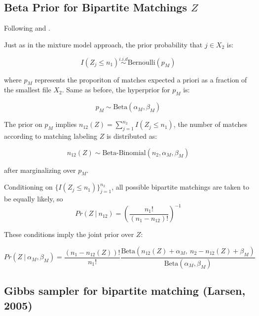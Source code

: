\documentclass[11pt,reqno]{amsart}
\begin{document}
\subsection{Beta Prior for Bipartite Matchings $Z$}

Following \cite{larsen_2005} and \cite{sadinle_2017}.

Just as in the mixture model approach, the prior probability that $j \in X_2$ is:

$$ I(Z_j \leq n_1)  \overset{i.i.d}{\sim} \text{Bernoulli}(p_M)$$

where $p_M$ represents the proporiton of matches expected a priori as a fraction of the smallest file $X_2$.  Same as before, the hyperprior for $p_M$ is:

$$ p_M \sim \text{Beta}(\alpha_{M}, \beta_{M})$$ 

The prior on $p_M$ implies $n_{12}(Z) = \sum_{j=1}^{n_2} I(Z_j \leq n_1)$, the number of matches according to matching labeling $Z$ is distributed as:

$$n_{12}(Z) \sim \text{Beta-Binomial}(n_2, \alpha_{M}, \beta_{M}) $$ 

after marginalizing over $p_M$.

Conditioning on $\{I(Z_j \leq n_1)\}_{j=1}^{n_2}$, all possible bipartite matchings are taken to be equally likely, so $$Pr(Z\ |\ n_{12}) = \left(\frac{n_1!}{(n_1-n_{12})!}\right)^{-1}$$

These conditions imply the joint prior over $Z$:

$$Pr(Z\ |\ \alpha_M, \beta_M) = \frac{(n_1-n_{12}(Z))!}{n_1!}\frac{\text{Beta}(n_{12}(Z) + \alpha_M,\ n_2-n_{12}(Z) + \beta_M)}{\text{Beta}(\alpha_M, \beta_M)}$$

\subsection{Gibbs sampler for bipartite matching (Larsen, 2005)}
\end{document}
